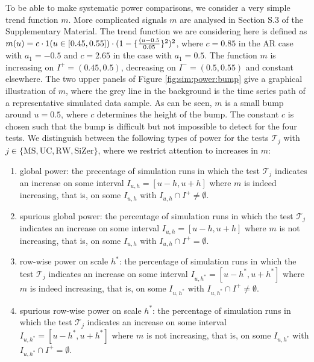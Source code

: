 To be able to make systematic power comparisons, we consider a very simple trend function $m$. More complicated signals $m$ are analysed in Section S.3 of the Supplementary Material. The trend function we are considering here is defined as $m(u) = c \cdot 1(u \in [0.45,0.55]) \cdot (1 - \{\frac{(u-0.5}{0.05}\}^2)^2$, where $c = 0.85$ in the AR case with $a_1 = -0.5$ and $c=2.65$ in the case with $a_1=0.5$. The function $m$ is increasing on $I^{+} = (0.45,0.5)$, decreasing on $I^{-} = (0.5,0.55)$ and constant elsewhere. The two upper panels of Figure \ref{fig:sim:power:bump} give a graphical illustration of $m$, where the grey line in the background is the time series path of a representative simulated data sample. As can be seen, $m$ is a small bump around $u=0.5$, where $c$ determines the height of the bump. The constant $c$ is chosen such that the bump is difficult but not impossible to detect for the four tests. We distinguish between the following types of power for the tests $\mathcal{T}_j$ with $j \in \{ \text{MS}, \text{UC}, \text{RW}, \text{SiZer} \}$, where we restrict attention to increases in $m$:
\begin{enumerate}[label=(\roman*),leftmargin=0.85cm]
\item global power: the precentage of simulation runs in which the test $\mathcal{T}_j$ indicates an increase on some interval $I_{u,h}=[u-h,u+h]$ where $m$ is indeed increasing, that is, on some $I_{u,h}$ with $I_{u,h} \cap I^+ \neq \emptyset$.
\item spurious global power: the percentage of simulation runs in which the test $\mathcal{T}_j$ indicates an increase on some interval $I_{u,h}=[u-h,u+h]$ where $m$ is not increasing, that is, on some $I_{u,h}$ with $I_{u,h} \cap I^+ = \emptyset$.
\item row-wise power on scale $h^*$: the percentage of simulation runs in which the test $\mathcal{T}_j$ indicates an increase on some interval $I_{u,h^*}=[u-h^*,u+h^*]$ where $m$ is indeed increasing, that is, on some $I_{u,h^*}$ with $I_{u,h^*} \cap I^+ \neq \emptyset$.
\item spurious row-wise power on scale $h^*$: the percentage of simulation runs in which the test $\mathcal{T}_j$ indicates an increase on some interval $I_{u,h^*}=[u-h^*,u+h^*]$ where $m$ is not increasing, that is, on some $I_{u,h^*}$ with $I_{u,h^*} \cap I^+ = \emptyset$.
\end{enumerate}


